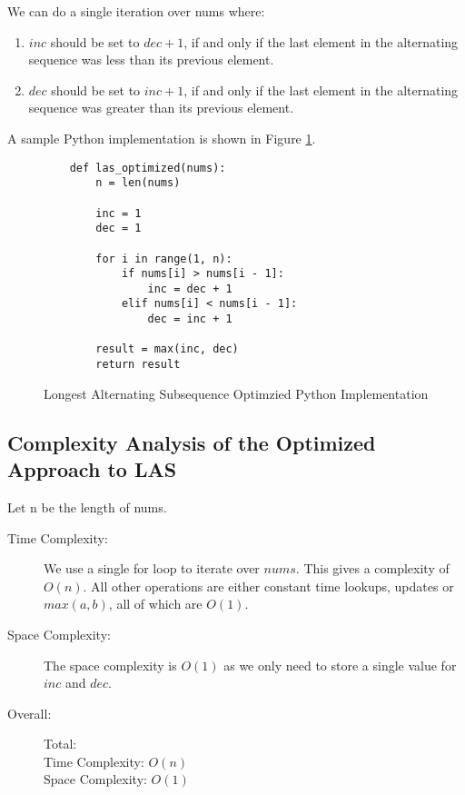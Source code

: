 We can do a single iteration over nums where:

\begin{enumerate}
    \item $inc$ should be set to $dec + 1$, if and only if the last element in the alternating sequence was less than its previous element.
    
    \item $dec$ should be set to $inc + 1$, if and only if the last element in the alternating sequence was greater than its previous element.

\end{enumerate}

A sample Python implementation is shown in Figure \ref{fig:las-optimized}.

\begin{figure}[H]
    \centering
    \begin{lstlisting}
    def las_optimized(nums):
        n = len(nums)
    
        inc = 1
        dec = 1
    
        for i in range(1, n):
            if nums[i] > nums[i - 1]:
                inc = dec + 1
            elif nums[i] < nums[i - 1]:
                dec = inc + 1
    
        result = max(inc, dec)
        return result
    \end{lstlisting}
    \caption{Longest Alternating Subsequence Optimzied Python Implementation}
    \label{fig:las-optimized}
\end{figure}

\subsection{Complexity Analysis of the Optimized Approach to LAS}
Let n be the length of nums.

\begin{description}
    \item[Time Complexity:]
        We use a single for loop to iterate over $nums$.
        This gives a complexity of $O(n)$.
        All other operations are either constant time lookups,
        updates or $max(a,b)$, all of which are $O(1)$.
        
    \item[Space Complexity:] 
        The space complexity is $O(1)$ as we only need to store a single value for $inc$ and $dec$.

    \item[Overall:] Total:\\
        Time Complexity: $O(n)$\\
        Space Complexity: $O(1)$
    
\end{description}

\newpage